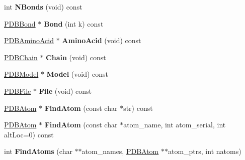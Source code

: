 \begin{DoxyCompactItemize}
\item 
int {\bfseries N\+Bonds} (void) const \hypertarget{class_p_d_b_residue_a60877e483d3aad43ec35b3f9d60ab08a}{}\label{class_p_d_b_residue_a60877e483d3aad43ec35b3f9d60ab08a}

\item 
\hyperlink{class_p_d_b_bond}{P\+D\+B\+Bond} $\ast$ {\bfseries Bond} (int k) const \hypertarget{class_p_d_b_residue_a00365b903608688f0a04e7919feadf49}{}\label{class_p_d_b_residue_a00365b903608688f0a04e7919feadf49}

\item 
\hyperlink{class_p_d_b_amino_acid}{P\+D\+B\+Amino\+Acid} $\ast$ {\bfseries Amino\+Acid} (void) const \hypertarget{class_p_d_b_residue_a6abf8bc365a8eb8296305d8db0e8d7cc}{}\label{class_p_d_b_residue_a6abf8bc365a8eb8296305d8db0e8d7cc}

\item 
\hyperlink{class_p_d_b_chain}{P\+D\+B\+Chain} $\ast$ {\bfseries Chain} (void) const \hypertarget{class_p_d_b_residue_ae1ebd698efd3999c6003c4e458a41e07}{}\label{class_p_d_b_residue_ae1ebd698efd3999c6003c4e458a41e07}

\item 
\hyperlink{class_p_d_b_model}{P\+D\+B\+Model} $\ast$ {\bfseries Model} (void) const \hypertarget{class_p_d_b_residue_a3f3795fd65157afa52c7408f02909f51}{}\label{class_p_d_b_residue_a3f3795fd65157afa52c7408f02909f51}

\item 
\hyperlink{class_p_d_b_file}{P\+D\+B\+File} $\ast$ {\bfseries File} (void) const \hypertarget{class_p_d_b_residue_aab24e9d7c2f9ec99c81c15cd9f23f46a}{}\label{class_p_d_b_residue_aab24e9d7c2f9ec99c81c15cd9f23f46a}

\item 
\hyperlink{class_p_d_b_atom}{P\+D\+B\+Atom} $\ast$ {\bfseries Find\+Atom} (const char $\ast$str) const \hypertarget{class_p_d_b_residue_ac651c68f7c01f3470b60d833bc0bcb2d}{}\label{class_p_d_b_residue_ac651c68f7c01f3470b60d833bc0bcb2d}

\item 
\hyperlink{class_p_d_b_atom}{P\+D\+B\+Atom} $\ast$ {\bfseries Find\+Atom} (const char $\ast$atom\+\_\+name, int atom\+\_\+serial, int alt\+Loc=0) const \hypertarget{class_p_d_b_residue_a1c3ce43411e9a279b2b95ddda8d9c916}{}\label{class_p_d_b_residue_a1c3ce43411e9a279b2b95ddda8d9c916}

\item 
int {\bfseries Find\+Atoms} (char $\ast$$\ast$atom\+\_\+names, \hyperlink{class_p_d_b_atom}{P\+D\+B\+Atom} $\ast$$\ast$atom\+\_\+ptrs, int natoms)\hypertarget{class_p_d_b_residue_a3003d2671d6277d77f70af4e56ef22f2}{}\label{class_p_d_b_residue_a3003d2671d6277d77f70af4e56ef22f2}


\end{DoxyCompactItemize}
